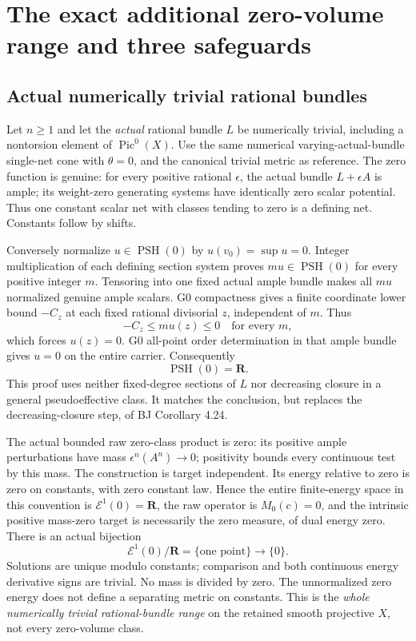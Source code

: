 \documentclass[10pt]{article}
\newcommand{\PSH}{\operatorname{PSH}}
\newcommand{\E}{\mathcal E}
\begin{document}
\section{The exact additional zero-volume range and three safeguards}
\subsection{Actual numerically trivial rational bundles}
Let $n\geq1$ and let the \emph{actual} rational bundle $L$ be numerically
trivial, including a nontorsion element of $\operatorname{Pic}^0(X)$.
Use the same numerical varying-actual-bundle single-net cone with
$\theta=0$, and the canonical trivial metric as reference. The zero
function is genuine: for every positive rational $\epsilon$, the actual
bundle $L+\epsilon A$ is ample; its weight-zero generating systems have
identically zero scalar potential. Thus one constant scalar net with
classes tending to zero is a defining net. Constants follow by shifts.

Conversely normalize $u\in\PSH(0)$ by $u(v_0)=\sup u=0$. Integer
multiplication of each defining section system proves $mu\in\PSH(0)$
for every positive integer $m$. Tensoring into one fixed actual ample
bundle makes all $mu$ normalized genuine ample scalars. G0 compactness
gives a finite coordinate lower bound $-C_z$ at each fixed rational
divisorial $z$, independent of $m$. Thus
\[
 -C_z\leq mu(z)\leq0\quad\text{for every }m,
\]
which forces $u(z)=0$. G0 all-point order determination in that ample
bundle gives $u=0$ on the entire carrier. Consequently
\[
 \PSH(0)=\mathbf R.                                 \tag{12.1}
\]
This proof uses neither fixed-degree sections of $L$ nor decreasing
closure in a general pseudoeffective class. It matches the conclusion,
but replaces the decreasing-closure step, of BJ Corollary 4.24.

The actual bounded raw zero-class product is zero: its positive ample
perturbations have mass $\epsilon^n(A^n)\to0$; positivity bounds every
continuous test by this mass. The construction is target independent.
Its energy relative to zero is zero on constants, with zero constant
law. Hence the entire finite-energy space in this convention is
$\E^1(0)=\mathbf R$, the raw operator is $M_0(c)=0$, and the intrinsic
positive mass-zero target is necessarily the zero measure, of dual energy
zero. There is an actual bijection
\[
 \E^1(0)/\mathbf R=\{\text{one point}\}\longrightarrow\{0\}.
                                                               \tag{12.2}
\]
Solutions are unique modulo constants; comparison and both continuous
energy derivative signs are trivial. No mass is divided by zero. The
unnormalized zero energy does not define a separating metric on constants.
This is the \emph{whole numerically trivial rational-bundle range} on
the retained smooth projective $X$, not every zero-volume class.
\end{document}
